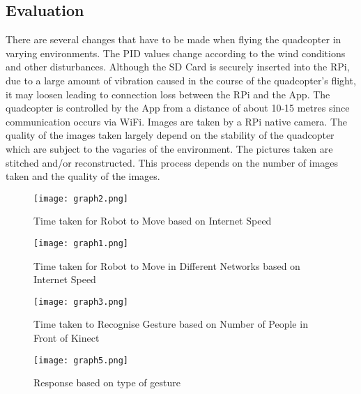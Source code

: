 \subsection{Evaluation}
There are several changes that have to be made when flying the quadcopter in varying environments. The PID values change according to the wind conditions and other disturbances. Although the SD Card is securely inserted into the RPi, due to a large amount of vibration caused in the course of the quadcopter's flight, it may loosen leading to connection loss between the RPi and the App. The quadcopter is controlled by the App from a distance of about 10-15 metres since communication occurs via WiFi. Images are taken by a RPi native camera. The quality of the images taken largely depend on the stability of the quadcopter which are subject to the vagaries of the environment.
The pictures taken are stitched and/or reconstructed. This process depends on the number of images taken and the quality of the images. 
\begin{figure}[H]
  \centering
  \texttt{[image: graph2.png]}
  \caption{Time taken for Robot to Move based on Internet Speed}
  \label{Internet speed based performance}	
\end{figure}


\begin{figure}[H]
  \centering
  \texttt{[image: graph1.png]}
  \caption{Time taken for Robot to Move in Different Networks based on Internet Speed}
  \label{Network based performance}	
\end{figure}

\begin{figure}[H]
  \centering
  \texttt{[image: graph3.png]}
  \caption{Time taken to Recognise Gesture based on Number of People in Front of Kinect}
  \label{Kinect performance}	
\end{figure}


\begin{figure}[H]
  \centering
  \texttt{[image: graph5.png]}
  \caption{Response based on type of gesture}
  \label{Gesture-action pair}	
\end{figure}


